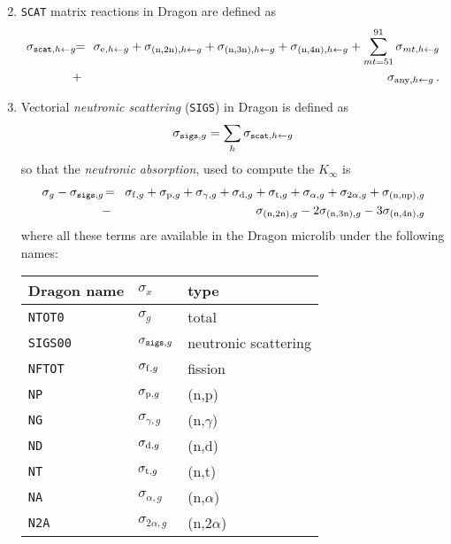 \begin{enumerate}
\begin{equation}
\end{equation}
\item {\tt SCAT} matrix reactions in Dragon are defined as
\begin{eqnarray}
\nonumber \sigma_{{\tt scat},h\leftarrow g} \negthinspace\negthinspace &=& \negthinspace\negthinspace \sigma_{{\rm e},h\leftarrow g}+\sigma_{{\rm (n,2n)},h\leftarrow g}+\sigma_{{\rm (n,3n)},h\leftarrow g}+\sigma_{{\rm (n,4n)},h\leftarrow g}
+\sum_{{\sl mt}=51}^{91} \sigma_{{\sl mt},h\leftarrow g} \\
&+& \negthinspace\negthinspace \sigma_{{\rm any},h\leftarrow g} \, .
\end{eqnarray}
\item Vectorial {\sl neutronic scattering} ({\tt SIGS}) in Dragon is defined as
\begin{equation}
\sigma_{{\tt sigs},g}=\sum_h \sigma_{{\tt scat},h\leftarrow g}
\end{equation}
\noindent so that the {\sl neutronic absorption}, used to compute the $K_\infty$ is
\begin{eqnarray}
\nonumber \sigma_g-\sigma_{{\tt sigs},g}\negthinspace &=&\negthinspace \sigma_{{\rm f},g}+\sigma_{{\rm p},g}+\sigma_{\gamma,g}
+\sigma_{{\rm d},g}+\sigma_{{\rm t},g}+\sigma_{\alpha,g}+\sigma_{2\alpha,g}+\sigma_{{\rm (n,np)},g}\\
&-&\negthinspace \sigma_{{\rm (n,2n)},g}-2\sigma_{{\rm (n,3n)},g}-3\sigma_{{\rm (n,4n)},g}
\label{eq:eq1}
\end{eqnarray}
\noindent where all these terms are available in the Dragon microlib under the following names:\\
\vskip 0.1cm
\begin{tabular}{| l | l | l |}
\hline
Dragon name & $\sigma_x$ & type \\
\hline
{\tt NTOT0} & $\sigma_g$ & total \\
{\tt SIGS00} & $\sigma_{{\tt sigs},g}$ & neutronic scattering \\
{\tt NFTOT} &$\sigma_{{\rm f},g}$ & fission \\
{\tt NP} & $\sigma_{{\rm p},g}$ & (n,p) \\
{\tt NG} & $\sigma_{\gamma,g}$ & (n,$\gamma$) \\
{\tt ND} &$\sigma_{{\rm d},g}$ & (n,d) \\
{\tt NT} &$\sigma_{{\rm t},g}$ & (n,t) \\
{\tt NA} &$\sigma_{\alpha,g}$ & (n,$\alpha$) \\
{\tt N2A} &$\sigma_{2\alpha,g}$ & (n,2$\alpha$) \\

\end{tabular}
\end{enumerate}
